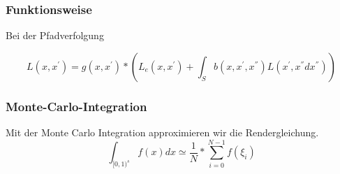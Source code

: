 \subsubsection{Funktionsweise}
Bei der Pfadverfolgung

    \begin{equation}
        L(x,{x}^{'}) = g(x,{x}^{'}) * (L_{e}(x,{x}^{'}) + 
                        \int_{S}^{} b(x,{x}^{'},{x}^{''})
                        L({x}^{'},{x}^{''}d{x}^{''})) 
    \end{equation}

\subsubsection{Monte-Carlo-Integration}
    Mit der Monte Carlo Integration approximieren wir die Rendergleichung.
    \cite{KK02}
    \label{pic:MonteCarloIntegration}
    \begin{equation}
    \int_{{[0,1)}^s} f(x) dx \simeq \frac{1}{N}*\sum_{i=0}^{N-1}f(\xi_i)
    \end{equation}


